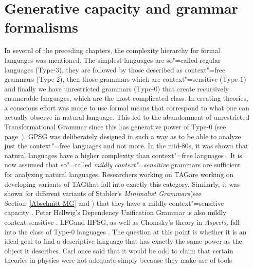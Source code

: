 
\chapter{Generative capacity and grammar formalisms}
\label{sec-generative-capacity}

\largerpage[-1]
In several of the preceding chapters,
the complexity hierarchy for formal languages was mentioned. The simplest languages are so"=called regular languages (Type-3),
they are followed by those described as context"=free grammars (Type-2), then those grammars which are 
context"=sensitive (Type-1) and finally we have unrestricted grammars (Type-0) that
create recursively enumerable languages, which are the most complicated class. In creating theories, a conscious effort was made to
use formal means that correspond to what one can actually observe in natural language.
This led to the abandonment of unrestricted Transformational Grammar since this has generative power of Type-0 (see page~\pageref{page-TG-Typ0}).
GPSG was deliberately designed in such a way as to be able to analyze just the context"=free
languages and not more. In the mid-80s, it was shown that natural languages have a higher complexity
than context"=free languages \citep{Shieber85a,Culy85a}. It is now assumed that so"=called
\emph{mildly context"=sensitive} grammars are sufficient for analyzing natural languages. Researchers
working on TAG\indextag are working on developing variants of TAG\indextag that fall into exactly
this category. Similarly, it was shown for different variants of Stabler's \emph{Minimalist
  Grammars}\indexmg (see Section~\ref{Abschnitt-MG} and \citealp{Stabler2001a,Stabler2010b}) that they
have a mildly context"=sensitive capacity \citep{Michaelis2001a-u}. Peter Hellwig's Dependency
Unification Grammar is also mildly context-sensitive
\citep[]{Hellwig2003a}. 
LFG\indexlfg and HPSG\indexhpsg, as well as Chomsky's theory in \emph{Aspects}, fall into the class of Type-0 languages \citep{Berwick82a-u,Johnson88}.
The question at this point is whether it is an ideal goal to find a descriptive language that has exactly the same power as the object it describes.
Carl \citet{Pollard96a} once said that it would be odd to claim that certain theories in physics were not adequate simply because they make use of tools
